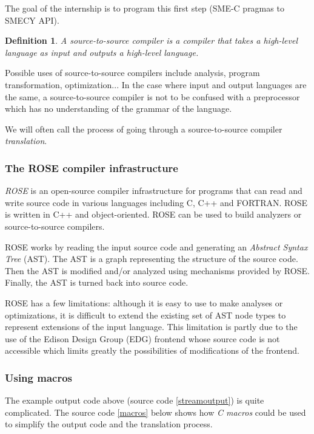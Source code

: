 \documentclass[a4paper]{article}
\newtheorem{defdef}{Definition}
\begin{document}
	The goal of the internship is to program this first step (SME-C pragmas to SMECY API).

	\begin{defdef}A \emph{source-to-source compiler} is a compiler that takes a high-level language as input and outputs a high-level language.
	\end{defdef}
	
	Possible uses of source-to-source compilers include analysis, program transformation, optimization... In the case where input and output languages are the same, a source-to-source compiler is not to be confused with a preprocessor which has no understanding of the grammar of the language.
	
	We will often call the process of going through a source-to-source compiler \emph{translation}.
	

	\subsubsection{The ROSE compiler infrastructure}
	\emph{ROSE} is an open-source compiler infrastructure for programs that can read and write source code in various languages including C, C++ and FORTRAN. ROSE is written in C++ and object-oriented. ROSE can be used to build analyzers or source-to-source compilers.
	
	ROSE works by reading the input source code and generating an \emph{Abstract Syntax Tree} (AST). The AST is a graph representing the structure of the source code. Then the AST is modified and/or analyzed using mechanisms provided by ROSE. Finally, the AST is turned back into source code.
	
	ROSE has a few limitations: although it is easy to use to make analyses or optimizations, it is difficult to extend the existing set of AST node types to represent extensions of the input language. This limitation is partly due to the use of the Edison Design Group (EDG) frontend whose source code is not accessible which limits greatly the possibilities of modifications of the frontend.
	
	\subsubsection{Using macros}
	
	The example output code above (source code \ref{streamoutput}) is
    quite complicated. The source code \ref{macros} below shows how
    \emph{C macros} could be used to simplify the output code and the translation process.
\end{document}

